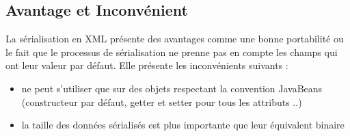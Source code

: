 \subsection{Avantage et Inconvénient}
La sérialisation en XML présente des avantages comme une bonne portabilité ou le fait que le processus de sérialisation ne prenne pas en compte les champs qui ont leur valeur par défaut. Elle présente les inconvénients suivants : 
\begin{itemize}
\item ne peut s'utiliser que sur des objets respectant la convention JavaBeans (constructeur par défaut, getter et setter pour tous les attributs ..)
\item la taille des données sérialisés est plus importante que leur équivalent binaire
\end{itemize}